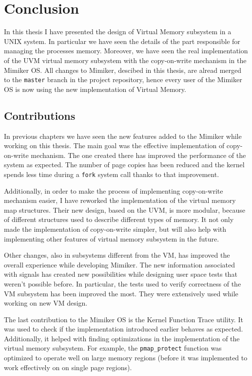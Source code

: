 \chapter{Conclusion}
\label{chapter:conclusion}

In this thesis I have presented the design of Virtual Memory subsystem in a UNIX system.
In particular we have seen the details of the part responsible for managing the processes memory.
Moreover, we have seen the real implementation of the UVM virtual memory subsystem with the copy-on-write mechanism in the Mimiker OS.
All changes to Mimiker, descibed in this thesis, are alread merged to the {\tt master} branch in the project repository, hence every user of the Mimiker OS is now using the new implementation of Virtual Memory.

\section{Contributions}

In previous chapters we have seen the new features added to the Mimiker while working on this thesis.
The main goal was the effective implementation of copy-on-write mechanism.
The one created there has improved the performance of the system as expected.
The number of page copies has been reduced and the kernel spends less time during a {\tt fork} system call thanks to that improvement.

Additionally, in order to make the process of implementing copy-on-write mechanism easier, I have reworked the implementation of the virtual memory map structures.
Their new design, based on the UVM, is more modular, because of different structures used to describe different types of memory.
It not only made the implementation of copy-on-write simpler, but will also help with implementing other features of virtual memory subsystem in the future.

Other changes, also in subsystems different from the VM, has improved the overall experience while developing Mimiker.
The new information associated with signals has created new possibilities while designing user space tests that weren't possible before.
In particular, the tests used to verify correctness of the VM subsystem has been improved the most.
They were extensively used while working on new VM design.

The last contribution to the Mimiker OS is the Kernel Function Trace utility.
It was used to check if the implementation introduced earlier behaves as expected.
Additionally, it helped with finding optimizations in the implementation of the virtual memory subsystem.
For example, the \texttt{pmap_protect} function was optimized to operate well on large memory regions
(before it was implemented to work effectively on on single page regions).

